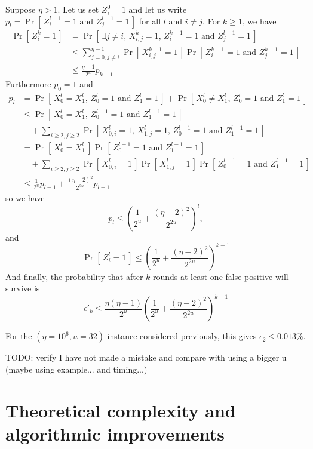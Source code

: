 \documentclass[11pt]{llncs}
\newcommand{\Prob}[1]{{\Pr\left[\,{#1}\,\right]}}
\begin{document}
Suppose $\eta > 1$. 
Let us set $Z^0_i = 1$ and let us write $p_l = \Prob{Z^{l-1}_{i} = 1 \text{ and } Z^{l-1}_{j} = 1} $ for all $l$ and $i \neq j$.
For $k \ge 1$, we have
\begin{align*} 
\Prob{Z^k_i=1} &= \Prob{\exists j\neq i \text{, } X^k_{i,j} = 1 \text{, } Z^{k-1}_{i} = 1  \text{ and } Z^{l-1}_{j} = 1}  \\ 
&\le \sum_{j=0, j\neq i}^{\eta-1} \Prob{X^{k-1}_{i,j} = 1} \Prob{Z^{k-1}_{i} = 1 \text{ and } Z^{k-1}_{j} = 1}  \\ 
&\le \frac{\eta-1}{2^u} p_{k-1}
\end{align*}
Furthermore $p_0 = 1$ and
\begin{align*}
p_l &= \Prob{X^{l}_0 = X^{l}_1 \text{, } Z^{l}_{0} = 1 \text{ and } Z^{l}_{1} = 1}
  + \Prob{X^{l}_0 \neq X^{l}_1 \text{, } Z^{l}_{0} = 1 \text{ and } Z^{l}_{1} = 1} \\
&\le \Prob{X^{l}_0 = X^{l}_1 \text{, } Z^{l-1}_{0} = 1 \text{ and } Z^{l-1}_{1} = 1} \\
  &\quad+ \sum_{i \ge 2, j \ge 2} \Prob{X^l_{0,i} = 1 \text{, } X^l_{1,j} = 1 \text{, } Z^{l-1}_{0} = 1 \text{ and } Z^{l-1}_{1} = 1} \\
&= \Prob{X^{l}_0 = X^{l}_1} \Prob{Z^{l-1}_{0} = 1 \text{ and } Z^{l-1}_{1} = 1} \\
  &\quad+ \sum_{i \ge 2, j \ge 2} \Prob{X^l_{0,i} = 1} \Prob{X^l_{1,j} = 1} \Prob{Z^{l-1}_{0} = 1 \text{ and } Z^{l-1}_{1} = 1} \\
&\le \frac{1}{2^u} p_{l-1} + \frac{(\eta-2)^2}{2^{2u}} p_{l-1}
\end{align*}
so we have
\[ p_l \le \left( \frac{1}{2^u} + \frac{(\eta-2)^2}{2^{2u}} \right)^l, \]
and
\[ \Prob{Z^l_i=1} \le \left( \frac{1}{2^u} + \frac{(\eta-2)^2}{2^{2u}} \right)^{k-1} \]
And finally, the probability that after $k$ rounds at least one false positive will survive is
\[
\epsilon'_k \le \frac{\eta(\eta-1)}{2^u} \left( \frac{1}{2^u} + \frac{(\eta-2)^2}{2^{2u}} \right)^{k-1}
\]

For the $(\eta=10^6,u=32)$ instance considered previously, this gives $\epsilon_2 \le 0.013\%$.

TODO: verify I have not made a mistake and compare with using a bigger u (maybe using example... and timing...)

\section{Theoretical complexity and algorithmic improvements}
\end{document}
